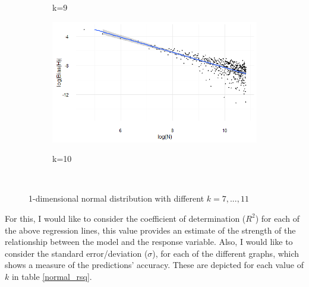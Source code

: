 \documentclass[12pt]{report}
\begin{document}
\begin{figure}
{\begin{subfigure}[b]{.6\textwidth}
\caption{k=9}
\end{subfigure}%
\begin{subfigure}[b]{.6\textwidth}
\centering
\includegraphics[width=\textwidth]{./Graphs/Best/Normal_k=10.png}\label{normal_k=10}
\caption{k=10}
\end{subfigure}%
}\    
\caption{1-dimensional normal distribution with different $k = 7, ...,11$} \label{normal_graphs711}
\end{figure}

For this, I would like to consider the coefficient of determination ($R^2$) for each of the above regression lines, this value provides an estimate of the strength of the relationship between the model and the response variable. Also, I would like to consider the standard error/deviation ($\sigma$), for each of the different graphs, which shows a measure of the predictions' accuracy. These are depicted for each value of $k$ in table \ref{normal_rsq}.
\end{document}
